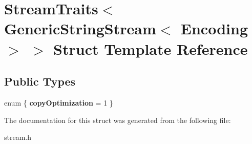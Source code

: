 \hypertarget{a00290}{}\section{Stream\+Traits$<$ Generic\+String\+Stream$<$ Encoding $>$ $>$ Struct Template Reference}
\label{a00290}
\subsection*{Public Types}
\begin{DoxyCompactItemize}
\item 
enum \{ {\bfseries copy\+Optimization} = 1
 \}\hypertarget{a00290_ac76bff6668c9e5f2a5929c5ca81c73e9}{}\label{a00290_ac76bff6668c9e5f2a5929c5ca81c73e9}

\end{DoxyCompactItemize}


The documentation for this struct was generated from the following file\+:\begin{DoxyCompactItemize}
\item 
stream.\+h\end{DoxyCompactItemize}
